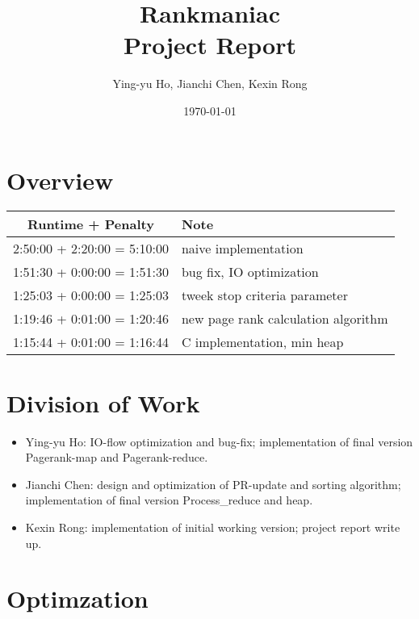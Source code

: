 \documentclass[12pt]{article}
\newcommand{\course}[2]{\def\courseName{#1} \def\sectName{#2}}
\newcommand{\assn}[1]{\def\assnName{#1}}
\begin{document}
\course{Rankmaniac}{}
\assn{Project Report}
\date{\today}
\title{\courseName \sectName \\ \assnName}
\author{Ying-yu Ho, Jianchi Chen, Kexin Rong}
\maketitle

\thispagestyle{empty}

\section{Overview}
\begin{center}
    \begin{tabular}{ | c | l | }
    \hline
    \textbf{Runtime + Penalty} & \textbf{Note} \\ \hline
    2:50:00 + 2:20:00 = 5:10:00 & naive implementation \\ 
    1:51:30  +  0:00:00  =  1:51:30 & bug fix, IO optimization \\
    1:25:03  +  0:00:00  =  1:25:03 & tweek stop criteria parameter \\
    1:19:46  +  0:01:00  =  1:20:46 & new page rank calculation algorithm\\
    1:15:44  +  0:01:00  =  1:16:44 & C implementation, min heap\\
    \hline
    \end{tabular}
\end{center}


\section{Division of Work}
\begin{itemize}
\item Ying-yu Ho: IO-flow optimization and bug-fix; implementation of final version Pagerank-map and Pagerank-reduce.
\item Jianchi Chen: design and optimization of PR-update and sorting algorithm; implementation of final version Process_reduce and heap.
\item Kexin Rong: implementation of initial working version; project report write up. 
\end{itemize}

\section{Optimzation}
\end{document}
